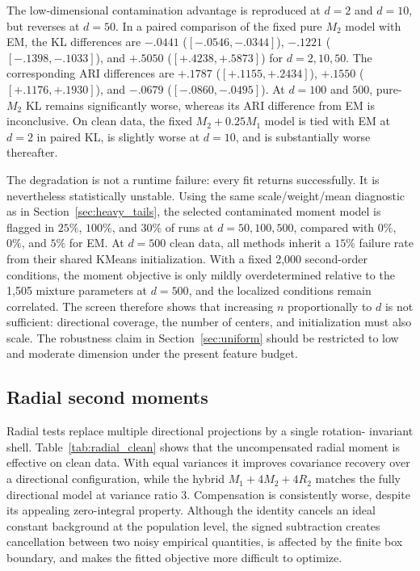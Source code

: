 \documentclass[11pt,a4paper]{article}
\newcommand{\Mone}{M_1}
\newcommand{\Mtwo}{M_2}
\newcommand{\Rtwo}{R_2}
\begin{document}
The low-dimensional contamination advantage is reproduced at $d=2$ and
$d=10$, but reverses at $d=50$.  In a paired comparison of the fixed pure
$\Mtwo$ model with EM, the KL differences are $-.0441$
($[-.0546,-.0344]$), $-.1221$ ($[-.1398,-.1033]$), and $+.5050$
($[+.4238,+.5873]$) for $d=2,10,50$.  The corresponding ARI differences are
$+.1787$ ($[+.1155,+.2434]$), $+.1550$ ($[+.1176,+.1930]$), and $-.0679$
($[-.0860,-.0495]$).  At $d=100$ and $500$, pure-$\Mtwo$ KL remains
significantly worse, whereas its ARI difference from EM is inconclusive.
On clean data, the fixed $\Mtwo+0.25\Mone$ model is tied with EM at $d=2$ in
paired KL, is slightly worse at $d=10$, and is substantially worse thereafter.

The degradation is not a runtime failure: every fit returns successfully.
It is nevertheless statistically unstable.  Using the same scale/weight/mean
diagnostic as in Section~\ref{sec:heavy_tails}, the selected contaminated
moment model is flagged in $25\%$, $100\%$, and $30\%$ of runs at
$d=50,100,500$, compared with $0\%$, $0\%$, and $5\%$ for EM.  At $d=500$
clean data, all methods inherit a $15\%$ failure rate from their shared
KMeans initialization.  With a fixed 2,000 second-order conditions, the
moment objective is only mildly overdetermined relative to the 1,505 mixture
parameters at $d=500$, and the localized conditions remain correlated.  The
screen therefore shows that increasing $n$ proportionally to $d$ is not
sufficient: directional coverage, the number of centers, and initialization
must also scale.  The robustness claim in Section~\ref{sec:uniform} should be
restricted to low and moderate dimension under the present feature budget.

\subsection{Radial second moments}
\label{sec:radial}

Radial tests replace multiple directional projections by a single rotation-
invariant shell.  Table~\ref{tab:radial_clean} shows that the uncompensated
radial moment is effective on clean data.  With equal variances it improves
covariance recovery over a directional configuration, while the hybrid
$\Mone+4\Mtwo+4\Rtwo$ matches the fully directional model at variance ratio
$3$.  Compensation is consistently worse, despite its appealing zero-integral
property.  Although the identity cancels an ideal constant background at the
population level, the signed subtraction creates cancellation between two
noisy empirical quantities, is affected by the finite box boundary, and makes
the fitted objective more difficult to optimize.
\end{document}
